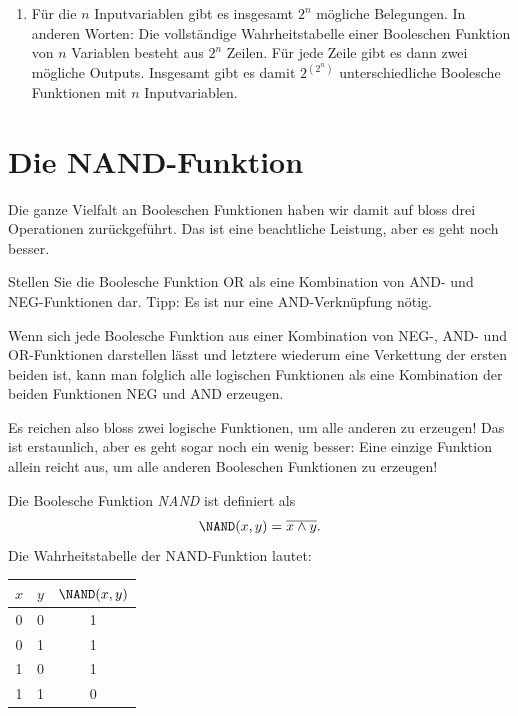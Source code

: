 \begin{myexercise}
\begin{myanswer}
\begin{enumerate}
       $$f(x,y,z) =  ((\overline{x} \wedge \overline{y}) \wedge \overline{z}) \vee ((\overline{x} \wedge y) \wedge z) \vee ((x \wedge \overline{y}) \wedge \overline{z}) \vee ((x \wedge y) \wedge z).$$
        \item Für die $n$ Inputvariablen gibt es insgesamt $2^n$ mögliche Belegungen. In anderen Worten: Die vollständige Wahrheitstabelle einer Booleschen Funktion von $n$ Variablen besteht aus $2^n$ Zeilen. Für jede Zeile gibt es dann zwei mögliche Outputs. Insgesamt gibt es damit $2^{(2^n)}$ unterschiedliche Boolesche Funktionen mit $n$ Inputvariablen.
    \end{enumerate}
\end{myanswer}
\end{myexercise}

\section{Die NAND-Funktion}
Die ganze Vielfalt an Booleschen Funktionen haben wir damit auf bloss drei Operationen zu\-rück\-ge\-führt. Das ist eine beachtliche Leistung, aber es geht noch besser.

\begin{myexercise}\label{myexercise:ORausANDundNEG}
     Stellen Sie die Boolesche Funktion OR als eine Kombination von AND- und NEG-Funktionen dar. Tipp: Es ist nur eine AND-Verknüpfung nötig.
\end{myexercise}

Wenn sich jede Boolesche Funktion aus einer Kombination von NEG-, AND- und OR-Funktionen darstellen lässt und letztere wiederum eine Verkettung der ersten beiden ist, kann man folglich alle logischen Funktionen als eine Kombination der beiden Funktionen NEG und AND erzeugen.

Es reichen also bloss zwei logische Funktionen, um alle anderen zu erzeugen! Das ist erstaunlich, aber es geht sogar noch ein wenig besser: Eine einzige Funktion allein reicht aus, um alle anderen Booleschen Funktionen zu erzeugen!

\begin{mydefinition}[NAND]\label{mydefinition:NAND}
    Die Boolesche Funktion \emph{NAND} ist definiert als
    $$\NAND(x,y) = 
    \overline{x\wedge y}.$$
    Die Wahrheitstabelle der NAND-Funktion lautet:
    \begin{center}
        \begin{tabular}{c|c||c}
            $x$&$y$&$\NAND(x,y)$ \\
            \hline
            0&0&1 \\
            0&1&1 \\
            1&0&1 \\
            1&1&0        
        \end{tabular}
    \end{center}
\end{mydefinition}

